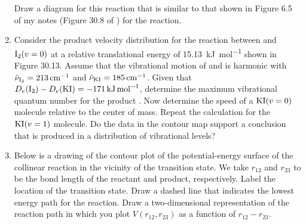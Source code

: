 \documentclass[../psets.tex]{subfiles}
\begin{document}
\begin{enumerate}[label={\textbf{30-\arabic*.}},leftmargin=3.5em]
\begin{center}
    \end{center}
    Draw a diagram for this reaction that is similar to that shown in Figure 6.5 of my notes (Figure 30.8 of \textcite{bib:McQuarrieSimon}) for the  reaction.
    \setcounter{enumi}{30}
    \item Consider the product velocity distribution for the reaction between  and $\ce{I2}(v=0)$ at a relative translational energy of \SI{15.13}{\kilo\joule\per\mole} shown in Figure 30.13. Assume that the vibrational motion of  and  is harmonic with $\tilde{\nu}_{\ce{I2}}=\SI{213}{\per\centi\meter}$ and $\tilde{\nu}_{\ce{KI}}=\SI{185}{\per\centi\meter}$. Given that $D_e(\ce{I2})-D_e(\ce{KI})=\SI{-171}{\kilo\joule\per\mole}$, determine the maximum vibrational quantum number for the product . Now determine the speed of a $\ce{KI}(v=0)$ molecule relative to the center of mass. Repeat the calculation for the $\ce{KI}(v=1)$ molecule. Do the data in the contour map support a conclusion that  is produced in a distribution of vibrational levels?
    \setcounter{enumi}{43}
    \item Below is a drawing of the contour plot of the potential-energy surface of the collinear  reaction in the vicinity of the transition state. We take $r_{12}$ and $r_{23}$ to be the bond length of the  reactant and product, respectively. Label the location of the transition state. Draw a dashed line that indicates the lowest energy path for the reaction. Draw a two-dimensional representation of the reaction path in which you plot $V(r_{12},r_{23})$ as a function of $r_{12}-r_{23}$.
    \begin{center}
\end{center}
\end{enumerate}
\end{document}
